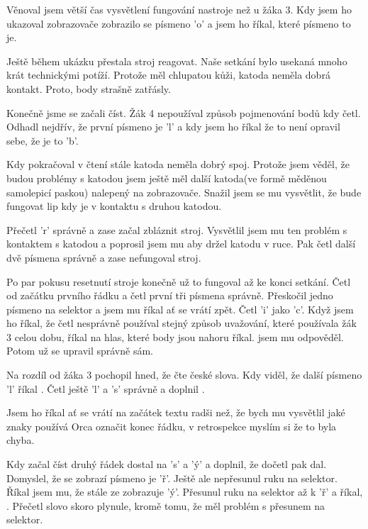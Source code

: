 Věnoval jsem větší čas vysvětlení fungování nastroje než u žáka 3. Kdy jsem ho ukazoval zobrazovače zobrazilo se písmeno 'o' a jsem ho říkal, které písmeno to je.

Ještě během ukázku přestala stroj reagovat.  Naše setkání bylo usekaná mnoho krát technickými potíží.  Protože měl chlupatou kůži, katoda neměla dobrá kontakt.  Proto, body strašně zatřásly.

Konečně jsme se začali číst.  Žák 4 nepoužíval způsob pojmenování bodů kdy četl.  Odhadl nejdřív, že první písmeno je 'l' a kdy jsem ho říkal že to není opravil sebe, že je to 'b'.

Kdy pokračoval v čtení stále katoda neměla dobrý spoj.  Protože jsem věděl, že budou problémy s katodou jsem ještě měl další katoda(ve formě měděnou samolepicí paskou) nalepený na zobrazovače. Snažil jsem se mu vysvětlit, že bude fungovat lip kdy je v kontaktu s druhou katodou.

Přečetl 'r' správně a zase začal zbláznit stroj.  Vysvětlil jsem mu ten problém s kontaktem s katodou a poprosil jsem mu aby držel katodu v ruce.  Pak četl další dvě písmena správně a zase nefungoval stroj.

Po par pokusu resetnutí stroje konečně už to fungoval až ke konci setkání.  Četl od začátku prvního řádku a četl první tři písmena správně. Přeskočil jedno písmeno na selektor a jsem mu říkal ať se vrátí zpět.  Četl 'i' jako 'c'. Když jsem ho říkal, že četl nesprávně používal stejný způsob uvažování, které používala žák 3 celou dobu, říkal na hlas, které body jsou nahoru  říkal.  jsem mu odpověděl. Potom už se upravil správně sám.

Na rozdíl od žáka 3 pochopil hned, že čte české slova.  Kdy viděl, že další písmeno 'l' říkal . Četl ještě 'l' a 's' správně a doplnil .

Jsem ho říkal ať se vrátí na začátek textu radši než, že bych mu vysvětlil jaké znaky používá Orca označit konec řádku, v retrospekce myslím si že to byla chyba.

Kdy začal číst druhý řádek dostal na 's' a 'ý' a doplnil, že dočetl  pak  dal. Domyslel, že se zobrazí písmeno je 'ř'.  Ještě ale nepřesunul ruku na selektor.  Říkal jsem mu, že stále ze zobrazuje 'ý'.  Přesunul ruku na selektor až k 'ř' a říkal, .  Přečetl slovo  skoro plynule, kromě tomu, že měl problém s přesunem na selektor.


